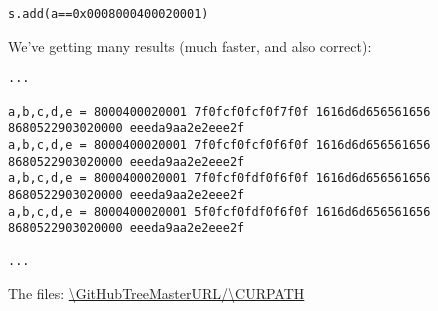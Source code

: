 \begin{lstlisting}
s.add(a==0x0008000400020001)
\end{lstlisting}

We've getting many results (much faster, and also correct):

\begin{lstlisting}
...

a,b,c,d,e = 8000400020001 7f0fcf0fcf0f7f0f 1616d6d656561656 8680522903020000 eeeda9aa2e2eee2f
a,b,c,d,e = 8000400020001 7f0fcf0fcf0f6f0f 1616d6d656561656 8680522903020000 eeeda9aa2e2eee2f
a,b,c,d,e = 8000400020001 7f0fcf0fdf0f6f0f 1616d6d656561656 8680522903020000 eeeda9aa2e2eee2f
a,b,c,d,e = 8000400020001 5f0fcf0fdf0f6f0f 1616d6d656561656 8680522903020000 eeeda9aa2e2eee2f

...
\end{lstlisting}

The files: \url{\GitHubTreeMasterURL/\CURPATH}

